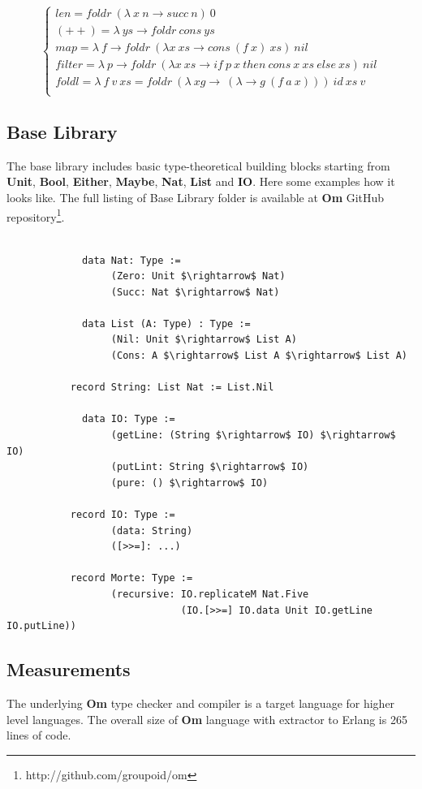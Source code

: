 \documentclass{aip-cp}
\begin{document}
$$
\begin{cases}
len = foldr\ (\lambda\ x\ n \rightarrow succ\ n)\ 0\\
(++) = \lambda\ ys \rightarrow foldr\ cons\ ys\\
map = \lambda\ f \rightarrow foldr\ (\lambda x\ xs \rightarrow cons\ (f\ x)\ xs)\ nil\\
filter = \lambda\ p \rightarrow foldr\ (\lambda x\ xs \rightarrow if\ p\ x\ then\ cons\ x\ xs\ else\ xs)\ nil\\
foldl = \lambda\ f\ v\ xs = foldr\ (\lambda\ xg\rightarrow\ (\lambda \rightarrow g\ (f\ a\ x)))\ id\ xs\ v\\
\end{cases}
$$

\subsection{Base Library}
The base library includes basic type-theoretical
building blocks starting from {\bf Unit}, {\bf Bool}, {\bf Either}, {\bf Maybe}, {\bf Nat}, {\bf List} and {\bf IO}.
Here some examples how it looks like. The full listing of Base Library folder
is available at {\bf Om} GitHub repository\footnote{http://github.com/groupoid/om}.

\begin{lstlisting}[mathescape=true]

             data Nat: Type :=
                  (Zero: Unit $\rightarrow$ Nat)
                  (Succ: Nat $\rightarrow$ Nat)

             data List (A: Type) : Type :=
                  (Nil: Unit $\rightarrow$ List A)
                  (Cons: A $\rightarrow$ List A $\rightarrow$ List A)

           record String: List Nat := List.Nil

             data IO: Type :=
                  (getLine: (String $\rightarrow$ IO) $\rightarrow$ IO)
                  (putLint: String $\rightarrow$ IO)
                  (pure: () $\rightarrow$ IO)

           record IO: Type :=
                  (data: String)
                  ([>>=]: ...)

           record Morte: Type :=
                  (recursive: IO.replicateM Nat.Five
                              (IO.[>>=] IO.data Unit IO.getLine IO.putLine))

\end{lstlisting}

\subsection{Measurements}
The underlying {\bf Om} type checker and compiler is a target
language for higher level languages. The overall
size of {\bf Om} language with extractor to Erlang is 265 lines of code.
\end{document}
